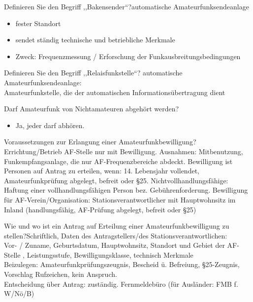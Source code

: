 \documentclass[avery5371,grid,frame,a4paper]{flashcards}
\newcommand{\card}[3]{
  \begin{flashcard}[{\chap} -- #1]{#2}#3\end{flashcard}
}
\begin{document}
\card{23}{Definieren Sie den Begriff ,,Bakensender``?}{automatische Amateurfunksendeanlage\begin{itemize}\itemsep1pt \item fester Standort \item sendet ständig technische und betriebliche Merkmale \item Zweck: Frequenzmessung / Erforschung der Funkausbreitungsbedingungen\end{itemize}}

\card{24}{Definieren Sie den Begriff ,,Relaisfunkstelle``?}{
  automatische Amateurfunksendeanlage: \\
  Amateurfunkstelle, die der automatischen Informationsübertragung dient
}

\card{25}{ Darf Amateurfunk von Nichtamateuren abgehört werden?}{\begin{itemize}\itemsep1pt \item Ja, jeder darf abhören.\end{itemize}}

\card{26}{Voraussetzungen zur Erlangung einer Amateurfunkbewilligung?}{Errichtung/Betrieb AF-Stelle nur mit Bewilligung. Ausnahmen:  Mitbenutzung, Funkempfangsanlage, die nur AF-Frequenzbereiche abdeckt. Bewilligung ist Personen auf Antrag zu erteilen, wenn: 14. Lebensjahr vollendet, Amateurfunkprüfung abgelegt, befreit oder §25. Nichtvollhandlungsfähige: Haftung einer vollhandlungsfähigen Person bez. Gebührenforderung. Bewilligung für AF-Verein/Organisation: Stationsverantwortlicher mit Hauptwohnsitz im Inland (handlungsfähig, AF-Prüfung abgelegt, befreit oder §25)}

\card{27}{Wie und wo ist ein Antrag auf Erteilung einer Amateurfunkbewilligung zu stellen?}{Schriftlich, Daten des Antragstellers/des Stationsverantwortlichen:\\ Vor- / Zuname, Geburtsdatum, Hauptwohnsitz, Standort und Gebiet der AF-Stelle , Leistungsstufe, Bewilligungsklasse, technisch Merkmale \\ Beizulegen: Amateurfunkprüfungszeugnis, Bescheid ü. Befreiung, §25-Zeugnis, Vorschlag Rufzeichen, kein Anspruch. \\ Entscheidung über Antrag: zuständig. Fernmeldebüro (für Ausländer: FMB f. W/Nö/B)}

\end{document}
